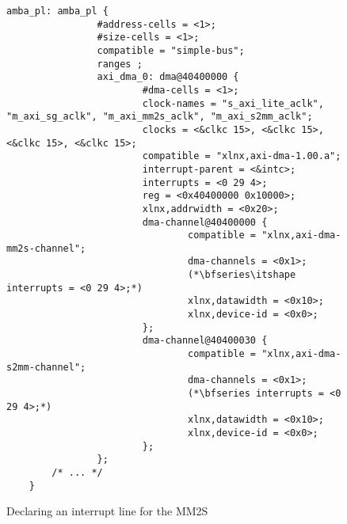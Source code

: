 \begin{figure}[ht!]
\centering
\begin{lstlisting}[style=basic]
        amba_pl: amba_pl {
                #address-cells = <1>;
                #size-cells = <1>;
                compatible = "simple-bus";
                ranges ;
                axi_dma_0: dma@40400000 {
                        #dma-cells = <1>;
                        clock-names = "s_axi_lite_aclk", "m_axi_sg_aclk", "m_axi_mm2s_aclk", "m_axi_s2mm_aclk";
                        clocks = <&clkc 15>, <&clkc 15>, <&clkc 15>, <&clkc 15>;
                        compatible = "xlnx,axi-dma-1.00.a";
                        interrupt-parent = <&intc>;
                        interrupts = <0 29 4>;
                        reg = <0x40400000 0x10000>;
                        xlnx,addrwidth = <0x20>;
                        dma-channel@40400000 {
                                compatible = "xlnx,axi-dma-mm2s-channel";
                                dma-channels = <0x1>;
                                (*\bfseries\itshape interrupts = <0 29 4>;*)
                                xlnx,datawidth = <0x10>;
                                xlnx,device-id = <0x0>;
                        };
                        dma-channel@40400030 {
                                compatible = "xlnx,axi-dma-s2mm-channel";
                                dma-channels = <0x1>;
                                (*\bfseries interrupts = <0 29 4>;*)
                                xlnx,datawidth = <0x10>;
                                xlnx,device-id = <0x0>;
                        };
                };
		/* ... */
	}
\end{lstlisting}
\caption{Declaring an interrupt line for the MM2S}
\label{lst:dma-int}
\end{figure}
